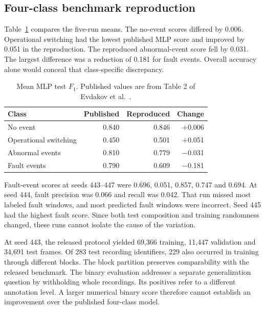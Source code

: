 \documentclass[11pt,conference,letterpaper]{IEEEtran}
\newcommand{\F}{\ensuremath{F_1}}
\begin{document}
\subsection{Four-class benchmark reproduction}
Table~\ref{tab:mlp} compares the five-run means. The no-event scores differed by 0.006. Operational switching had the lowest published MLP score and improved by 0.051 in the reproduction. The reproduced abnormal-event score fell by 0.031. The largest difference was a reduction of 0.181 for fault events. Overall accuracy alone would conceal that class-specific discrepancy.
\begin{table}[t]\centering\caption{Mean MLP test \F{}. Published values are from Table 2 of Evdakov et al.~\cite{osc}.}\label{tab:mlp}
\begin{tabular}{lrrr}\toprule Class & Published & Reproduced & Change\\\midrule
No event&0.840&0.846&$+$0.006\\
Operational switching&0.450&0.501&$+$0.051\\
Abnormal events&0.810&0.779&$-$0.031\\
Fault events&0.790&0.609&$-$0.181\\\bottomrule\end{tabular}\end{table}

Fault-event scores at seeds 443--447 were 0.696, 0.051, 0.857, 0.747 and 0.694. At seed 444, fault precision was 0.066 and recall was 0.042. That run missed most labeled fault windows, and most predicted fault windows were incorrect. Seed 445 had the highest fault score. Since both test composition and training randomness changed, these runs cannot isolate the cause of the variation.

At seed 443, the released protocol yielded 69,366 training, 11,447 validation and 34,691 test frames. Of 283 test recording identifiers, 229 also occurred in training through different blocks. The block partition preserves comparability with the released benchmark. The binary evaluation addresses a separate generalization question by withholding whole recordings. Its positives refer to a different annotation level. A larger numerical binary score therefore cannot establish an improvement over the published four-class model.
\end{document}
